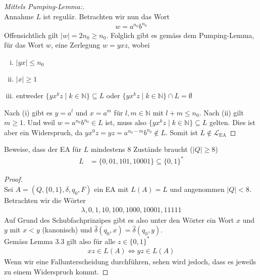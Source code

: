 \documentclass[a4paper,ngerman,12pt]{exam}
\begin{document}
\begin{questions}
\begin{solutionorbox}[18em]
      \begin{proof}[Mittels Pumping-Lemma:] $ $\\
        Annahme $L$ ist regulär. Betrachten wir nun das Wort
        \begin{align*}
          w = a^{n_0}b^{n_0}
        \end{align*}
        Offensichtlich gilt $|w| = 2n_0 \geq n_0$.
        Folglich gibt es gemäss dem Pumping-Lemma, für das Wort $w$, eine Zerlegung
        $w = yxz$, wobei
        \begin{enumerate}[(i)]
          \item $|yx| \leq n_0$
          \item $|x| \geq 1$
          \item entweder $\{y x^k z \mid k \in \mathbb{N}\} \subseteq L$
            oder $\{y x^k z \mid k \in \mathbb{N}\} \cap L = \emptyset$
        \end{enumerate}
        Nach (i) gibt es $y = a^l$ und $x = a^m$ für $l,m \in \mathbb{N}$
        mit $l+m \leq n_0$. Nach (ii) gilt $m \geq 1$. Und weil
        $w = a^{n_0}b^{n_0} \in L$ ist, muss also
        $\{y x^k z \mid k \in \mathbb{N}\} \subseteq L$ gelten. Dies ist aber ein
        Widerspruch, da $yx^0z = yz = a^{n_0-m}b^{n_0} \not\in L$. Somit ist
        $L \not\in \mathcal{L}_{\mathrm{EA}}$
      \end{proof}
    \end{solutionorbox}
    \question
  Beweise, dass der EA für $L$ mindestens 8 Zustände braucht ($|Q| \geq 8$)
  \begin{align*}
    L &= \{0, 01, 101, 10001\} \subseteq \{0,1\}^*
  \end{align*}

   \begin{solutionorbox}[20em]
  \begin{proof} $ $\\
    Sei $A = (Q, \{0,1\}, \delta,q_0,F)$ ein EA
    mit $L(A) = L$ und angenommen
    $|Q| < 8$.\\
    Betrachten wir die Wörter
    \begin{align*}
      \lambda, 0, 1, 10, 100, 1000 , 10001, 11111
    \end{align*}
    Auf Grund des Schubfachprinzipes gibt es also unter den Wörter
    ein Wort $x$ und $y$ mit $x < y$ (kanonisch) und
    $\hat{\delta}(q_0, x) = \hat{\delta}(q_0, y)$. \\
    Gemäss Lemma 3.3 gilt also für alle $z \in \{0,1\}^*$
    \begin{align*}
      xz \in L(A) \iff yz \in L(A)
    \end{align*}
    Wenn wir eine Fallunterscheidung durchführen, sehen wird jedoch,
    dass es jeweils zu einem Widerspruch kommt.


\end{proof}
\end{solutionorbox}
\end{questions}
\end{document}
